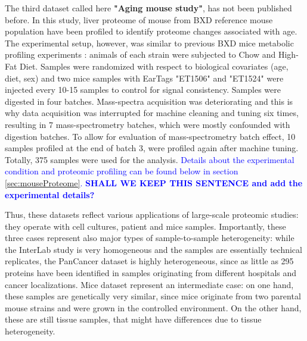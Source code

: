 \documentclass[num-refs]{wiley-article}
\begin{document}
The third dataset called here \textbf{"Aging mouse study"}, has not been published before. In this study, liver proteome of mouse from BXD reference mouse population \cite{Peirce:2004aa} have been profiled to identify proteome changes associated with age. The experimental setup, however, was similar to previous BXD mice metabolic profiling experiments \cite{Williams:2016aa}: animals of each strain were subjected to Chow and High-Fat Diet. Samples were randomized with respect to biological covariates (age, diet, sex) and two mice samples with EarTags "ET1506" and "ET1524" were injected every 10-15 samples to control for signal consistency. Samples were digested in four batches. Mass-spectra acquisition was deteriorating and this is why data acquisition was interrupted for machine cleaning and tuning six times, resulting in 7 mass-spectrometry batches, which were mostly confounded with digestion batches. To allow for evaluation of mass-spectrometry batch effect, 10 samples profiled at the end of batch 3, were profiled again after machine tuning. Totally, 375 samples were used for the analysis. \textcolor{blue}{Details about the experimental condition and proteomic profiling can be found below in section \ref{sec:mouseProteome}. \textbf{SHALL WE KEEP THIS SENTENCE and add the experimental details?}}

Thus, these datasets reflect various applications of large-scale proteomic studies: they operate with cell cultures, patient and mice samples. Importantly, these three cases represent also major types of sample-to-sample heterogeneity: while the InterLab study is very homogeneous and the samples are essentially technical replicates, the PanCancer dataset is highly heterogeneous, since as little as 295 proteins have been identified in samples originating from different hospitals and cancer localizations. Mice dataset represent an intermediate case: on one hand, these samples are genetically very similar, since mice originate from two parental mouse strains and were grown in the controlled environment. On the other hand, these are still tissue samples, that might have differences due to tissue heterogeneity.
\end{document}
